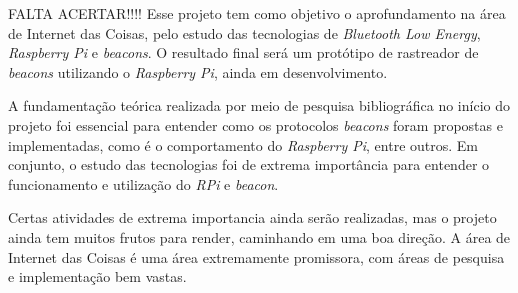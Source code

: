 \documentclass[
		12pt,				%
		openright,			%
		oneside,			%
		a4paper,			%
		chapter=TITLE,		%
		english,			%
		brazil				%
	]{abntex2}
\begin{document}
FALTA ACERTAR!!!! Esse projeto tem como objetivo o aprofundamento na área de Internet das Coisas, pelo estudo das tecnologias de \textit{Bluetooth Low Energy}, \textit{Raspberry Pi} e \textit{beacons}. O resultado final será um protótipo de rastreador de \textit{beacons} utilizando o \textit{Raspberry Pi}, ainda em desenvolvimento.

A fundamentação teórica realizada por meio de pesquisa bibliográfica no início do projeto foi essencial para entender como os protocolos \textit{beacons} foram propostas e implementadas, como é o comportamento do \textit{Raspberry Pi}, entre outros. Em conjunto, o estudo das tecnologias foi de extrema importância para entender o funcionamento e utilização do \textit{RPi} e \textit{beacon}.

Certas atividades de extrema importancia ainda serão realizadas, mas o projeto ainda tem muitos frutos para render, caminhando em uma boa direção. A área de Internet das Coisas é uma área extremamente promissora, com áreas de pesquisa e implementação bem vastas. 









\begin{apendicesenv}



\end{apendicesenv}

\end{document}

